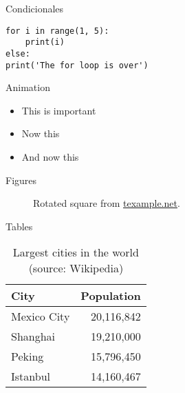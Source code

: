 \documentclass[10pt]{beamer}
\begin{document}
\begin{frame}[fragile]{Condicionales}
\begin{verbatim}
for i in range(1, 5):
	print(i)
else:
print('The for loop is over')
\end{verbatim}
\end{frame}
\begin{frame}{Animation}
  \begin{itemize}[<+- | alert@+>]
    \item \alert<4>{This is important}
    \item Now this
    \item And now this
  \end{itemize}
\end{frame}
\begin{frame}{Figures}
  \begin{figure}
    \setcounter{density}{20}
    \caption{Rotated square from
    \href{http://www.texample.net/tikz/examples/rotated-polygons/}{texample.net}.}
  \end{figure}
\end{frame}
\begin{frame}{Tables}
  \begin{table}
    \caption{Largest cities in the world (source: Wikipedia)}
    \begin{tabular}{lr}
      \toprule
      City & Population\\
      \midrule
      Mexico City & 20,116,842\\
      Shanghai & 19,210,000\\
      Peking & 15,796,450\\
      Istanbul & 14,160,467\\
      \bottomrule
    \end{tabular}
  \end{table}
\end{frame}
\end{document}
